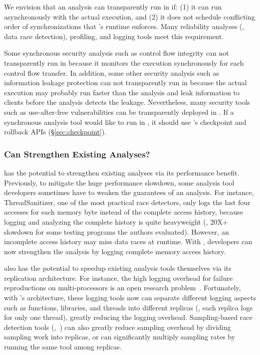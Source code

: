 We envision that an analysis can transparently run in \xxx if: (1) it can run 
asynchronously with the actual execution, and (2) it does not schedule 
conflicting order of \pthread synchronizations that \xxx's \dmt runtime 
enforces. Many reliability analyses (\eg, data race detection), profiling, 
and logging tools meet this requirement.

Some synchronous security analysis such as control 
flow integrity can not transparently run in \xxx because it monitors the 
execution 
synchronously for each control flow transfer. In addition, some other security 
analysis such as information leakage protection can not transparently run in 
\xxx 
because the actual execution may probably run faster than the 
analysis and leak information to clients before the analysis detects the 
leakage. Nevertheless, many security tools such as use-after-free 
vulnerabilities can be transparently deployed in \xxx. If a synchronous 
analysis 
tool would like to run in \xxx, it should use \xxx's checkpoint 
and rollback APIs (\S\ref{sec:checkpoint}).


\subsubsection{Can \xxx Strengthen Existing Analyses?} 
\label{sec:strengthen-analysis}

\xxx has the potential to strengthen existing analyses via its performance 
benefit. Previously, to mitigate the huge performance slowdown, some analysis 
tool developers sometimes have to weaken the guarantees of an analysis. For 
instance, ThreadSanitizer\cite{tsan}, one of the most practical race detectors, 
only logs the last four accesses for each memory byte instead of the complete 
access history, because logging and analyzing the complete history is quite 
heavyweight (\eg, 20X+ slowdown for some testing programs the authors 
evaluated). However, an incomplete access history may miss data races at 
runtime. With \xxx, developers can now strengthen the analysis by logging 
complete memory access history.

\xxx also has the potential to speedup existing analysis tools themselves via 
its replication architecture. For instance, the high logging overhead for 
failure reproductions on multi-processors is an open research 
problem~\cite{sherlog:asplos10}. Fortunately, with \xxx's architecture, these 
logging tools now can separate different logging aspects such as functions, 
libraries, and threads into different replicas (\eg, each replica logs for only 
one thread), greatly reducing the logging overhead. Sampling-based race 
detection tools (\eg,~\cite{datacollider:osdi10}) can also greatly reduce 
sampling overhead by dividing sampling work into replicas, or can significantly 
multiply sampling rates by running the same tool among replicas.

